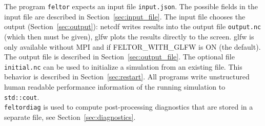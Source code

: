  The program \texttt{feltor}
 expects an input file \texttt{input.json}.
 The possible fields in the input file are described in Section~\ref{sec:input_file}.
 The input file chooses the output (Section~\ref{sec:output}): netcdf
 writes results into the output file \texttt{output.nc} (which then
 must be given), glfw plots the results directly to the screen. glfw is only
 available without MPI and if FELTOR\_WITH\_GLFW is ON (the default).
 The output file is described in Section~\ref{sec:output_file}.
 The optional file \texttt{initial.nc} can be used to initialize a simulation from an existing file.
 This behavior is described in Section~\ref{sec:restart}.
 All programs write unstructured human readable performance information of the running simulation
 to \texttt{std::cout}.
 \\
 \texttt{feltordiag} is used to compute post-processing diagnostics that are
 stored in a separate file, see Section~\ref{sec:diagnostics}.

